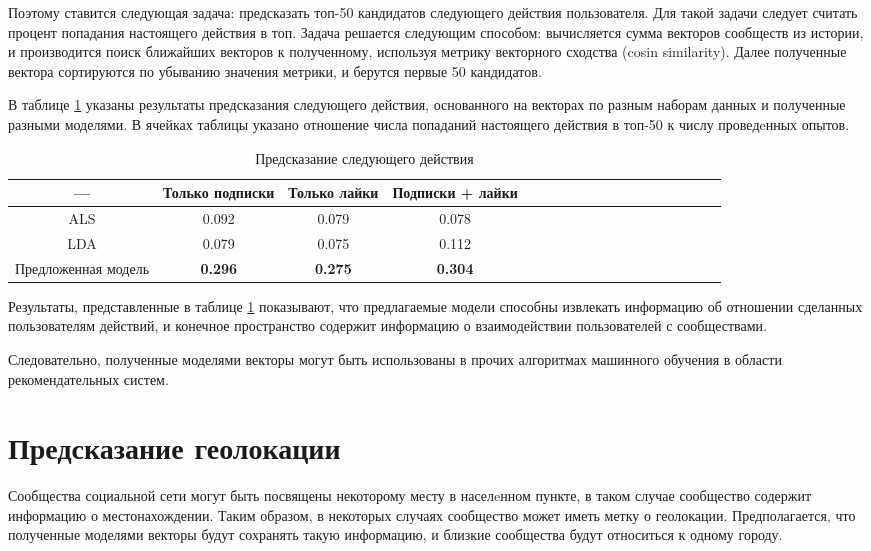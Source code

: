 \documentclass[times,specification,annotation]{itmo-student-thesis}
\begin{document}
Поэтому ставится следующая задача: предсказать топ-50 кандидатов следующего действия пользователя. Для такой задачи следует считать процент попадания настоящего действия в топ. Задача решается следующим способом: вычисляется сумма векторов сообществ из истории, и производится поиск ближайших векторов к полученному, используя метрику векторного сходства (cosin similarity). Далее полученные вектора сортируются по убыванию значения метрики, и берутся первые 50 кандидатов.

В таблице \ref {tab2-next-action} указаны результаты предсказания следующего действия, основанного на векторах по разным наборам данных и полученные разными моделями. В ячейках таблицы указано отношение числа попаданий настоящего действия в топ-50 к числу проведeнных опытов.  

\begin{table}[!h]
\caption{Предсказание следующего действия} \label{tab2-next-action}
\centering
\begin{tabular}{|*{18}{c|}}\hline
---  & Только подписки  & Только лайки & Подписки + лайки \\\hline
ALS                        & 0.092 & 0.079  & 0.078 \\\hline
LDA                       & 0.079 & 0.075  & 0.112 \\\hline
Предложенная модель & \textbf{0.296} & \textbf{0.275} & \textbf{0.304} \\\hline
\end{tabular}
\end{table}

Результаты, представленные в таблице \ref{tab2-next-action} показывают, что предлагаемые модели способны извлекать информацию об отношении сделанных пользователям действий, и конечное пространство содержит информацию о взаимодействии пользователей с сообществами. 

Следовательно, полученные моделями векторы могут быть использованы в прочих алгоритмах машинного обучения в области рекомендательных систем.

\section{Предсказание геолокации} \label{sec:geo}

Сообщества социальной сети могут быть посвящены некоторому месту в населeнном пункте, в таком случае сообщество содержит информацию о местонахождении. Таким образом, в некоторых случаях сообщество может иметь метку о геолокации. Предполагается, что полученные моделями векторы будут сохранять такую информацию, и близкие сообщества будут относиться к одному городу. 
\end{document}
